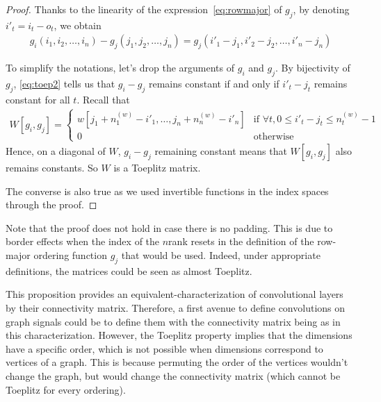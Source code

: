 \begin{proof}
Thanks to the linearity of the expression~\eqref{eq:rowmajor} of $g_j$, by denoting $i'_t = i_t - o_t$, we obtain
\begin{gather}
  g_i(i_1, i_2, \ldots, i_n) - g_j(j_1, j_2, \ldots, j_n) = g_j(i'_1 - j_1, i'_2 - j_2, \ldots, i'_n - j_n)
\label{eq:toep2}
\end{gather}

To simplify the notations, let's drop the arguments of $g_i$ and $g_j$. By bijectivity of $g_j$, \eqref{eq:toep2} tells us that $g_i - g_j$ remains constant if and only if $i'_t - j_t$ remains constant for all $t$. Recall that 
\begin{gather}
  W[g_i,g_j] =
 \begin{cases}
   w[j_1 + n_1^{(w)} - i'_1, \ldots, j_n + n_n^{(w)} - i'_n] & \text{if } \forall t, 0 \le i'_t - j_t \le n_t^{(w)} - 1 \\
   0 & \text{otherwise}
 \end{cases}
\label{eq:toep3}
\end{gather}
Hence, on a diagonal of $W$, $g_i - g_j$ remaining constant means that $W[g_i,g_j]$ also remains constants. So $W$ is a Toeplitz matrix.

The converse is also true as we used invertible functions in the index spaces through the proof.
\end{proof}

\begin{remark}
Note that the proof does not hold in case there is no padding. This is due to border effects when the index of the $n$\powth rank resets in the definition of the row-major ordering function $g_j$ that would be used. Indeed, under appropriate definitions, the matrices could be seen as almost Toeplitz.
\end{remark}

This proposition provides an equivalent-characterization of convolutional layers by their connectivity matrix. Therefore, a first avenue to define convolutions on graph signals could be to define them with the connectivity matrix being as in this characterization. However, the Toeplitz property implies that the dimensions have a specific order, which is not possible when dimensions correspond to vertices of a graph. This is because permuting the order of the vertices wouldn't change the graph, but would change the connectivity matrix (which cannot be Toeplitz for every ordering).


